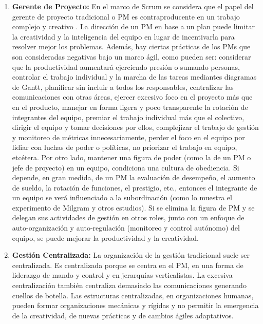 \begin{enumerate}
\item \textbf{Gerente de Proyecto:} En el marco de Scrum se considera que el papel del gerente de proyecto tradicional o PM es contraproducente en un trabajo complejo y creativo \cite{Ken-Schwaber-2011}. La dirección de un PM en base a un plan puede limitar la creatividad y la inteligencia del equipo en lugar de incentivarla para resolver mejor los problemas. Además, hay ciertas prácticas de los PMs que son consideradas negativas bajo un marco ágil, como pueden ser: considerar que la productividad aumentará ejerciendo presión o sumando personas, controlar el trabajo individual y la marcha de las tareas mediantes diagramas de Gantt, planificar sin incluir a todos los responsables, centralizar las comunicaciones con otras áreas, ejercer excesivo foco en el proyecto más que en el producto, manejar en forma ligera y poco transparente la rotación de integrantes del equipo, premiar el trabajo individual más que el colectivo, dirigir el equipo y tomar decisiones por ellos, complejizar el trabajo de gestión y monitoreo de métricas innecesariamente, perder el foco en el equipo por lidiar con luchas de poder o políticas, no priorizar el trabajo en equipo, etcétera. Por otro lado, mantener una figura de poder (como la de un PM o jefe de proyecto) en un equipo, condiciona una cultura de obediencia. Si depende, en gran medida, de un PM la evaluación de desempeño, el aumento de sueldo, la rotación de funciones, el prestigio, etc., entonces el integrante de un equipo se verá influenciado a la subordinación (como lo muestra el experimento de Milgram y otros estudios). Si se elimina la figura de PM y se delegan sus actividades de gestión en otros roles, junto con un enfoque de auto-organización y auto-regulación (monitoreo y control autónomo) del equipo, se puede mejorar la productividad y la creatividad.

\item \textbf{Gestión Centralizada:} La organización de la gestión tradicional suele ser centralizada. Es centralizada porque se centra en el PM, en una forma de liderazgo de mando y control y en jerarquías verticalistas. La excesiva centralización también centraliza demasiado las comunicaciones generando cuellos de botella. Las estructuras centralizadas, en organizaciones humanas, pueden formar organizaciones mecánicas y rígidas y no permitir la emergencia de la creatividad, de nuevas prácticas y de cambios ágiles adaptativos.

\end{enumerate}


